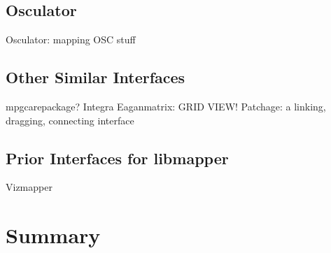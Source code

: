 \subsection{Osculator}
	Osculator: mapping OSC stuff 
\subsection{Other Similar Interfaces}
	mpgcarepackage?
	Integra 
	Eaganmatrix: GRID VIEW! 
	Patchage: a linking, dragging, connecting interface 
\subsection{Prior Interfaces for libmapper} \label{sec:priorGUIs}
	Vizmapper 


\section{Summary}
	